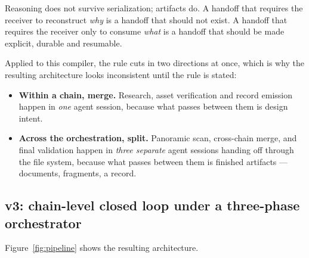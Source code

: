 \documentclass[10pt,a4paper]{article}
\begin{document}
\noindent Reasoning does not survive serialization; artifacts do. A handoff that
requires the receiver to reconstruct \emph{why} is a handoff that should not
exist. A handoff that requires the receiver only to consume \emph{what} is a
handoff that should be made explicit, durable and resumable.

Applied to this compiler, the rule cuts in two directions at once, which is why
the resulting architecture looks inconsistent until the rule is stated:

\begin{itemize}[leftmargin=1.4em,itemsep=2pt]
\item \textbf{Within a chain, merge.} Research, asset verification and record
  emission happen in \emph{one} agent session, because what passes between them
  is design intent.
\item \textbf{Across the orchestration, split.} Panoramic scan, cross-chain
  merge, and final validation happen in \emph{three separate} agent sessions
  handing off through the file system, because what passes between them is
  finished artifacts --- documents, fragments, a record.
\end{itemize}

\subsection{v3: chain-level closed loop under a three-phase orchestrator}

Figure~\ref{fig:pipeline} shows the resulting architecture.
\end{document}

